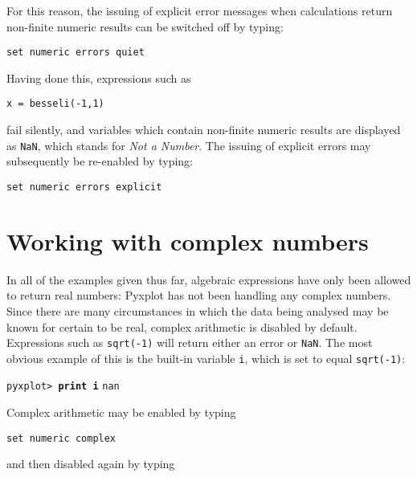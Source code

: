 For this reason, the issuing of explicit error messages when calculations
return non-finite numeric results can be switched off by typing:

\begin{verbatim}
set numeric errors quiet
\end{verbatim}

\noindent Having done this, expressions such as

\begin{verbatim}
x = besseli(-1,1)
\end{verbatim}

\noindent fail silently, and variables which contain non-finite numeric results
are displayed as {\tt NaN}, which stands for {\it Not a
Number}.  The issuing of explicit errors may subsequently
be re-enabled by typing: 

\begin{verbatim}
set numeric errors explicit
\end{verbatim}

\section{Working with complex numbers}
\label{sec:complex_numbers}

In all of the examples given thus far, algebraic expressions have only been
allowed to return real numbers: Pyxplot has not been handling any complex
numbers. Since there are many circumstances in which the data being analysed
may be known for certain to be real, complex arithmetic is disabled by default.
Expressions such as {\tt sqrt(-1)} will return either an error or {\tt NaN}.
The most obvious example of this is the built-in variable {\tt i}, which is set
to equal {\tt sqrt(-1)}:

\vspace{3mm}
\noindent\texttt{pyxplot> \textbf{print i}}\newline
\noindent\texttt{nan}
\vspace{3mm}

Complex arithmetic may be enabled by typing

\begin{verbatim}
set numeric complex
\end{verbatim}

\noindent and then disabled again by typing

